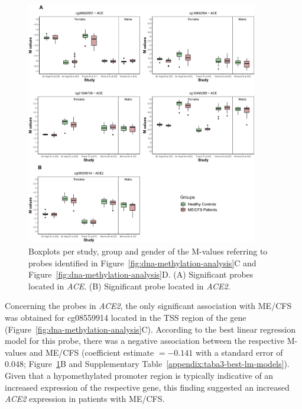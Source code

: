 \begin{figure}
    \centering\includegraphics[width=0.9\textwidth]{chapter/2021-ace-ace2/figures/fig2-ace-ace2-mvalues.jpg}
    \caption[Boxplots per study, group and gender of the M-values referring to probes identified in Figure~\ref{fig:dna-methylation-analysis}C and Figure~\ref{fig:dna-methylation-analysis}D]{Boxplots per study, group and gender of the M-values referring to probes identified in Figure~\ref{fig:dna-methylation-analysis}C and Figure~\ref{fig:dna-methylation-analysis}D. (A) Significant probes located in \textit{ACE}. (B) Significant probe located in \textit{ACE2}.}
    \label{fig:ace-ace2-mvalues}
\end{figure}

Concerning the probes in \textit{ACE2}, the only significant association with ME/CFS was obtained for cg08559914 located in the TSS region of the gene (Figure~\ref{fig:dna-methylation-analysis}C). According to the best linear regression model for this probe, there was a negative association between the respective M-values and ME/CFS (coefficient estimate $= -0.141$ with a standard error of 0.048; Figure~\ref{fig:ace-ace2-mvalues}B and Supplementary Table~\ref{appendix:taba3-best-lm-models}). Given that a hypomethylated promoter region is typically indicative of an increased expression of the respective gene, this finding suggested an increased \textit{ACE2} expression in patients with ME/CFS.

